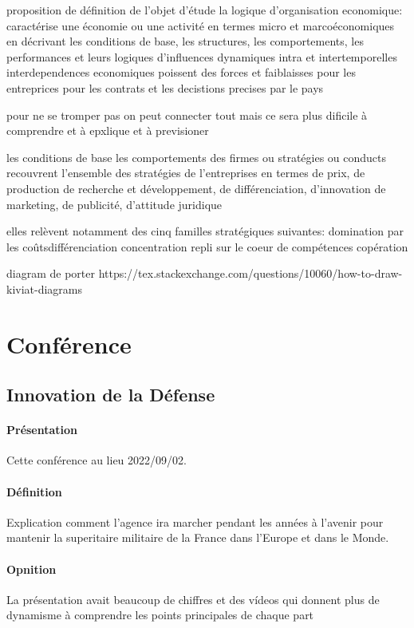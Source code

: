 \documentclass{article}
\begin{document}
proposition de définition de l'objet d'étude
la logique d'organisation economique: caractérise une économie ou une activité en termes micro et marcoéconomiques en décrivant les conditions de base, les structures, les comportements, les performances et leurs logiques d'influences dynamiques intra et intertemporelles
interdependences economiques poissent des forces et faiblaisses pour  les entreprices pour les contrats et les decistions precises par le pays

pour ne se tromper pas on peut connecter tout mais ce sera plus dificile à comprendre et à epxlique et à previsioner

les conditions de base
les comportements des firmes ou stratégies ou conducts recouvrent l'ensemble des stratégies de l'entreprises en termes de prix, de production de recherche et développement, de différenciation, d'innovation de marketing, de publicité, d'attitude juridique

elles relèvent notamment des cinq familles stratégiques suivantes:
    domination par les coûtsdifférenciation
    concentration
    repli sur le coeur de compétences
    copération

diagram de porter
https://tex.stackexchange.com/questions/10060/how-to-draw-kiviat-diagrams



\newpage\section{Conférence}
\subsection{Innovation de la Défense}
\paragraph{Présentation} Cette conférence au lieu 2022/09/02.

\paragraph{Définition}Explication comment l'agence ira marcher pendant les années à l'avenir pour mantenir la superitaire militaire de la France dans l'Europe et dans le Monde.

\paragraph{Opnition}La présentation avait beaucoup de chiffres et des vídeos qui donnent plus de dynamisme à comprendre les points principales de chaque part
\end{document}
